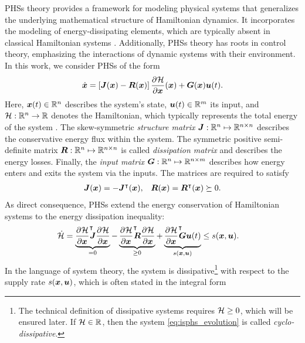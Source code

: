 \Glspl{PHS} theory provides a framework for modeling physical systems that generalizes the underlying mathematical structure of Hamiltonian dynamics. It incorporates the modeling of energy-dissipating elements, which are typically absent in classical Hamiltonian systems \cite{vanderschaft2014}. Additionally, \glspl{PHS} theory has roots in control theory, emphasizing the interactions of dynamic systems with their environment.
In this work, we consider \glspl{PHS} of the form
\begin{equation}\label{eq:isphs_evolution}
    \dot{\boldsymbol{x}} = \left[\boldsymbol{J}(\boldsymbol{x}) - \boldsymbol{R}(\boldsymbol{x})\right]\frac{\partial^{}{\mathcal{H}}}{\partial\boldsymbol{x}^{}}(\boldsymbol{x}) + \boldsymbol{G}(\boldsymbol{x})\boldsymbol{u}(t).
\end{equation}
Here, $\boldsymbol{x}(t)\in{\mathbb{R}}^n$ describes the system's state, ${\boldsymbol{u}(t)\in{\mathbb{R}}^m}$ its input, and ${\mathcal{H}}:{\mathbb{R}}^n\rightarrow{\mathbb{R}}$ denotes the Hamiltonian, which typically represents the total energy of the system \cite{vanderschaft2014, beattie2018}.
The skew-symmetric \emph{structure matrix} ${\boldsymbol{J}:{\mathbb{R}}^n\mapsto{\mathbb{R}}^{n\times n}}$ describes the conservative energy flux within the system. 
The symmetric positive semi-definite matrix ${\boldsymbol{R}:{\mathbb{R}}^n\mapsto{\mathbb{R}}^{n\times n}}$ is called \emph{dissipation matrix} and describes the energy losses. Finally, the \emph{input matrix} ${\boldsymbol{G}:{\mathbb{R}}^n\mapsto{\mathbb{R}}^{n\times m}}$ describes how energy enters and exits the system via the inputs.
The matrices are required to satisfy
\begin{align}\label{eq:isophs_psd_condition}
    \boldsymbol{J}(\boldsymbol{x})=-\boldsymbol{J}^{\intercal}(\boldsymbol{x}), && \boldsymbol{R}(\boldsymbol{x})=\boldsymbol{R}^{\intercal}(\boldsymbol{x})\succeq0.
\end{align}
As direct consequence, \glspl{PHS} extend the energy conservation of Hamiltonian systems to the energy dissipation inequality:
\begin{equation}\label{eq:isphs_energy_balance}\begin{split}
    \dot{{\mathcal{H}}} &=     \underbrace{\frac{\partial^{}{\mathcal{H}}}{\partial\boldsymbol{x}^{}}^{\intercal}\mkern-8mu\boldsymbol{J}\frac{\partial^{}{\mathcal{H}}}{\partial\boldsymbol{x}^{}}}_{\substack{\vphantom{\geq}=0}} - \underbrace{\frac{\partial^{}{\mathcal{H}}}{\partial\boldsymbol{x}^{}}^{\intercal}\mkern-8mu\boldsymbol{R}\frac{\partial^{}{\mathcal{H}}}{\partial\boldsymbol{x}^{}}}_{\substack{\geq0}} + \underbrace{\frac{\partial^{}{\mathcal{H}}}{\partial\boldsymbol{x}^{}}^{\intercal}\mkern-8mu\boldsymbol{G}\boldsymbol{u}(t)}_{\substack{s(\boldsymbol{x}, \boldsymbol{u})}}
        \leq s(\boldsymbol{x},\boldsymbol{u}).
\end{split}
\end{equation}
In the language of system theory, the system is dissipative\footnote{The technical definition of dissipative systems requires ${\mathcal{H}}\geq0$, which will be ensured later. If ${\mathcal{H}}\in{\mathbb{R}}$, then the system \cref{eq:isphs_evolution} is called \emph{cyclo-dissipative}.} with respect to the supply rate $s(\boldsymbol{x},\boldsymbol{u})$, which is often stated in the integral form

